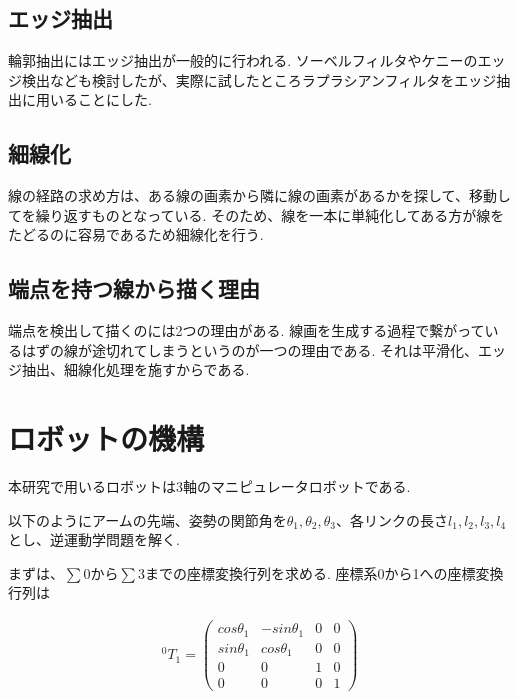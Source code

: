 \documentclass[a4j]{jarticle}			%
\begin{document}
\begin{multicols}{2}
\subsection{エッジ抽出}
輪郭抽出にはエッジ抽出が一般的に行われる.
ソーベルフィルタやケニーのエッジ検出なども検討したが、実際に試したところラプラシアンフィルタをエッジ抽出に用いることにした.


\subsection{細線化}
線の経路の求め方は、ある線の画素から隣に線の画素があるかを探して、移動してを繰り返すものとなっている.
そのため、線を一本に単純化してある方が線をたどるのに容易であるため細線化を行う.


\subsection{端点を持つ線から描く理由}
端点を検出して描くのには2つの理由がある.
線画を生成する過程で繋がっているはずの線が途切れてしまうというのが一つの理由である.
それは平滑化、エッジ抽出、細線化処理を施すからである.

\section{ロボットの機構}
本研究で用いるロボットは3軸のマニピュレータロボットである.

以下のようにアームの先端、姿勢の関節角を$\theta_1, \theta_2, \theta_3$、各リンクの長さ$l_1, l_2, l_3, l_4$とし、逆運動学問題を解く.

まずは、$\sum{0}\text{から}\sum{3}$までの座標変換行列を求める. 
座標系0から1への座標変換行列は

\begin{equation*}
	\begin{array}{cc}
		^{0}T_{1}=
		\left( 
			\begin{array}{cccc}
				cos\theta_1 & -sin\theta_1 & 0 & 0 \\
				sin\theta_1 & cos\theta_1 & 0 & 0 \\
				0 & 0 & 1 & 0 \\
				0 & 0 & 0 & 1 
			\end{array}
		\right)
	\end{array}
\end{equation*}



\end{multicols}
\end{document}
